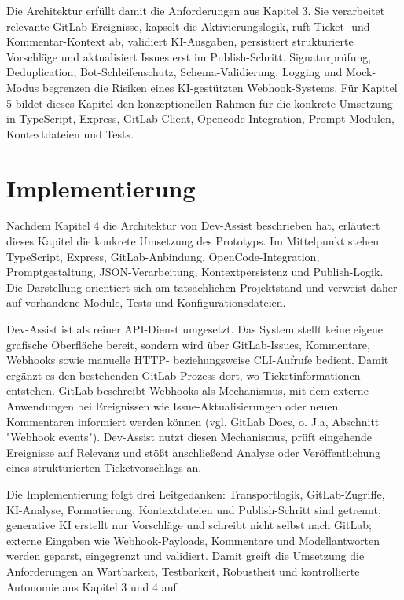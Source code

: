 \documentclass[12pt,a4paper,oneside]{scrreprt}
\begin{document}
Die Architektur erfüllt damit die Anforderungen aus Kapitel 3. Sie verarbeitet relevante GitLab-Ereignisse, kapselt die Aktivierungslogik, ruft Ticket- und Kommentar-Kontext ab, validiert KI-Ausgaben, persistiert strukturierte Vorschläge und aktualisiert Issues erst im Publish-Schritt. Signaturprüfung, Deduplication, Bot-Schleifenschutz, Schema-Validierung, Logging und Mock-Modus begrenzen die Risiken eines KI-gestützten Webhook-Systems. Für Kapitel 5 bildet dieses Kapitel den konzeptionellen Rahmen für die konkrete Umsetzung in TypeScript, Express, GitLab-Client, Opencode-Integration, Prompt-Modulen, Kontextdateien und Tests.

\chapter{Implementierung}

Nachdem Kapitel 4 die Architektur von Dev-Assist beschrieben hat, erläutert dieses Kapitel die konkrete Umsetzung des Prototyps. Im Mittelpunkt stehen TypeScript, Express, GitLab-Anbindung, OpenCode-Integration, Promptgestaltung, JSON-Verarbeitung, Kontextpersistenz und Publish-Logik. Die Darstellung orientiert sich am tatsächlichen Projektstand und verweist daher auf vorhandene Module, Tests und Konfigurationsdateien.

Dev-Assist ist als reiner API-Dienst umgesetzt. Das System stellt keine eigene grafische Oberfläche bereit, sondern wird über GitLab-Issues, Kommentare, Webhooks sowie manuelle HTTP- beziehungsweise CLI-Aufrufe bedient. Damit ergänzt es den bestehenden GitLab-Prozess dort, wo Ticketinformationen entstehen. GitLab beschreibt Webhooks als Mechanismus, mit dem externe Anwendungen bei Ereignissen wie Issue-Aktualisierungen oder neuen Kommentaren informiert werden können (vgl. GitLab Docs, o. J.a, Abschnitt "Webhook events"). Dev-Assist nutzt diesen Mechanismus, prüft eingehende Ereignisse auf Relevanz und stößt anschließend Analyse oder Veröffentlichung eines strukturierten Ticketvorschlags an.

Die Implementierung folgt drei Leitgedanken: Transportlogik, GitLab-Zugriffe, KI-Analyse, Formatierung, Kontextdateien und Publish-Schritt sind getrennt; generative KI erstellt nur Vorschläge und schreibt nicht selbst nach GitLab; externe Eingaben wie Webhook-Payloads, Kommentare und Modellantworten werden geparst, eingegrenzt und validiert. Damit greift die Umsetzung die Anforderungen an Wartbarkeit, Testbarkeit, Robustheit und kontrollierte Autonomie aus Kapitel 3 und 4 auf.
\end{document}
